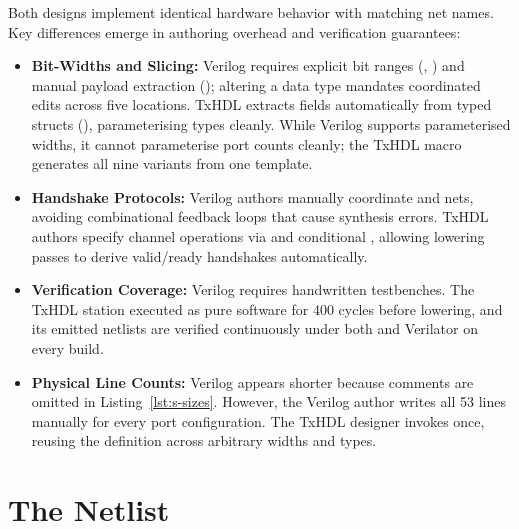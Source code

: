\documentclass[journal,9pt]{IEEEtran}
\begin{document}






Both designs implement identical hardware behavior with matching net names.
Key differences emerge in authoring overhead and verification guarantees:

\begin{itemize}
\item \textbf{Bit-Widths and Slicing:} Verilog requires explicit bit ranges
  (\code{[9:0]}, \code{[17:0]}) and manual payload extraction
  (); altering a data type mandates coordinated edits
  across five locations. TxHDL extracts fields automatically from typed structs
  (), parameterising types cleanly. While Verilog supports
  parameterised widths, it cannot parameterise port counts cleanly; the TxHDL
  macro generates all nine variants from one template.
\item \textbf{Handshake Protocols:} Verilog authors manually coordinate
   and  nets, avoiding combinational feedback loops that
  cause synthesis errors. TxHDL authors specify channel operations via
   and conditional , allowing lowering passes
  to derive valid/ready handshakes automatically.
\item \textbf{Verification Coverage:} Verilog requires handwritten testbenches.
  The TxHDL station executed as pure software for 400 cycles before lowering,
  and its emitted netlists are verified continuously under both  and
  Verilator on every build.
\item \textbf{Physical Line Counts:} Verilog appears shorter because comments
  are omitted in Listing~\ref{lst:s-sizes}. However, the Verilog author writes
  all 53 lines manually for every port configuration. The TxHDL designer
  invokes  once, reusing the definition across
  arbitrary widths and types.
\end{itemize}

\section{The Netlist}
\label{sec:s-netlist}
\end{document}

